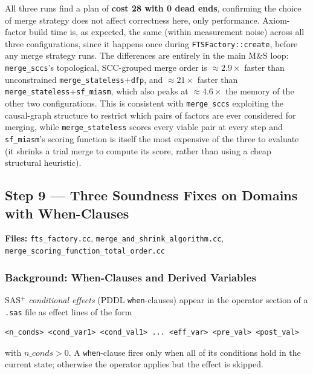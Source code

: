 \documentclass[11pt,a4paper]{article}
\begin{document}
All three runs find a plan of \textbf{cost 28 with 0 dead ends}, confirming
the choice of merge strategy does not affect correctness here, only
performance. Axiom-factor build time is, as expected, the same (within
measurement noise) across all three configurations, since it happens once
during \texttt{FTSFactory::create}, before any merge strategy runs. The
differences are entirely in the main M\&S loop: \texttt{merge\_sccs}'s
topological, SCC-grouped merge order is $\approx 2.9\times$ faster than
unconstrained \texttt{merge\_stateless}+\texttt{dfp}, and $\approx 21\times$
faster than \texttt{merge\_stateless}+\texttt{sf\_miasm}, which also peaks at
$\approx 4.6\times$ the memory of the other two configurations. This is
consistent with \texttt{merge\_sccs} exploiting the causal-graph structure to
restrict which pairs of factors are ever considered for merging, while
\texttt{merge\_stateless} scores every viable pair at every step and
\texttt{sf\_miasm}'s scoring function is itself the most expensive of the
three to evaluate (it shrinks a trial merge to compute its score, rather than
using a cheap structural heuristic).

\subsection{Step 9 --- Three Soundness Fixes on Domains with When-Clauses}
\label{sec:step9}

\textbf{Files:} \texttt{fts\_factory.cc},
\texttt{merge\_and\_shrink\_algorithm.cc},
\texttt{merge\_scoring\_function\_total\_order.cc}

\subsubsection{Background: When-Clauses and Derived Variables}

SAS$^+$ \emph{conditional effects} (PDDL \texttt{when}-clauses) appear in
the operator section of a \texttt{.sas} file as effect lines of the form

\begin{lstlisting}
<n_conds> <cond_var1> <cond_val1> ... <eff_var> <pre_val> <post_val>
\end{lstlisting}

with $n\_conds > 0$.  A \texttt{when}-clause fires only when all of its
conditions hold in the current state; otherwise the operator applies but the
effect is skipped.
\end{document}
